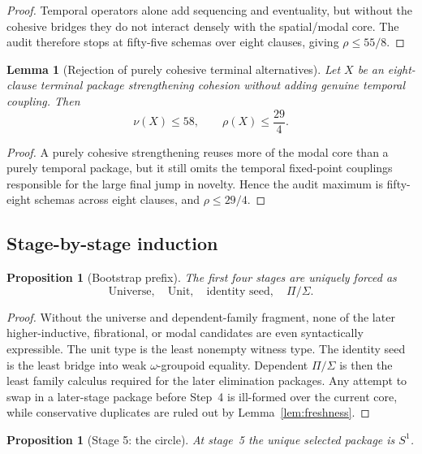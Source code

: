 \documentclass{lmcs}
\theoremstyle{plain}
\newtheorem{lem}[thm]{Lemma}
\newtheorem{prop}[thm]{Proposition}
\theoremstyle{definition}
\theoremstyle{remark}
\begin{document}
\begin{proof}
Temporal operators alone add sequencing and eventuality, but without the cohesive bridges they do not interact densely with the spatial/modal core.
The audit therefore stops at fifty-five schemas over eight clauses, giving $\rho\le 55/8$.
\end{proof}

\begin{lem}[Rejection of purely cohesive terminal alternatives]
\label{lem:reject-pure-cohesive}
Let $X$ be an eight-clause terminal package strengthening cohesion without adding genuine temporal coupling.
Then
\[
  \nu(X)\le 58,\qquad \rho(X)\le \frac{29}{4}.
\]
\end{lem}

\begin{proof}
A purely cohesive strengthening reuses more of the modal core than a purely temporal package, but it still omits the temporal fixed-point couplings responsible for the large final jump in novelty.
Hence the audit maximum is fifty-eight schemas across eight clauses, and $\rho\le 29/4$.
\end{proof}

\subsection{Stage-by-stage induction}

\begin{prop}[Bootstrap prefix]
\label{prop:appendix-bootstrap}
The first four stages are uniquely forced as
\[
  \text{Universe},\quad \text{Unit},\quad \text{identity seed},\quad \Pi/\Sigma.
\]
\end{prop}

\begin{proof}
Without the universe and dependent-family fragment, none of the later higher-inductive, fibrational, or modal candidates are even syntactically expressible.
The unit type is the least nonempty witness type.
The identity seed is the least bridge into weak $\omega$-groupoid equality.
Dependent $\Pi/\Sigma$ is then the least family calculus required for the later elimination packages.
Any attempt to swap in a later-stage package before Step~4 is ill-formed over the current core, while conservative duplicates are ruled out by Lemma~\ref{lem:freshness}.
\end{proof}

\begin{prop}[Stage 5: the circle]
\label{prop:appendix-stage5}
At stage~5 the unique selected package is $S^1$.
\end{prop}
\end{document}
